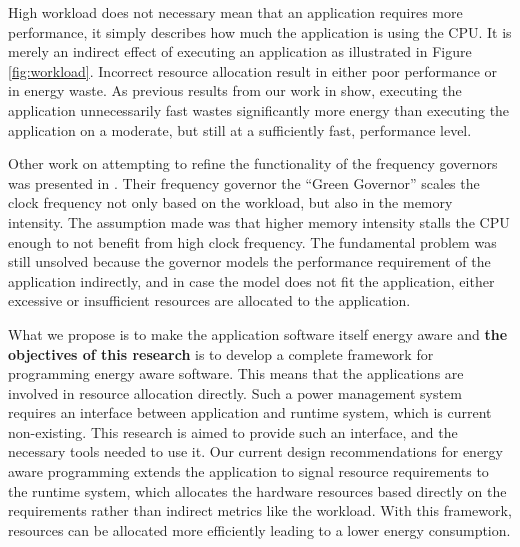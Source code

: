 \documentclass{article}
\begin{document}
High workload does not necessary mean that an application requires more performance, it simply describes how much the application is using the CPU.
It is merely an indirect effect of executing an application as illustrated in Figure \ref{fig:workload}.
Incorrect resource allocation result in either poor performance or in energy waste.
As previous results from our work in \cite{HolmbackaHipeac, HolmbackaDasip} show, executing the application unnecessarily fast wastes significantly more energy than executing the application on a moderate, but still at a sufficiently fast, performance level.\smallskip

Other work on attempting to refine the functionality of the frequency governors was presented in \cite{Spiliopoulos:11}.
Their frequency governor the ``Green Governor'' scales the clock frequency not only based on the workload, but also in the memory intensity.
The assumption made was that higher memory intensity stalls the CPU enough to not benefit from high clock frequency.
The fundamental problem was still unsolved because the governor models the performance requirement of the application indirectly,
and in case the model does not fit the application, either excessive or insufficient resources are allocated to the application.\smallskip

What we propose is to make the application software itself energy aware and \textbf{the objectives of this research} is to develop a complete framework for programming energy aware software.
This means that the applications are involved in resource allocation directly.
Such a power management system requires an interface between application and runtime system, which is current non-existing.
This research is aimed to provide such an interface, and the necessary tools needed to use it.
Our current design recommendations for energy aware programming extends the application to signal resource requirements to the runtime system, which allocates the hardware resources based directly on the requirements rather than indirect metrics like the workload.
With this framework, resources can be allocated more efficiently leading to a lower energy consumption.
\end{document}
